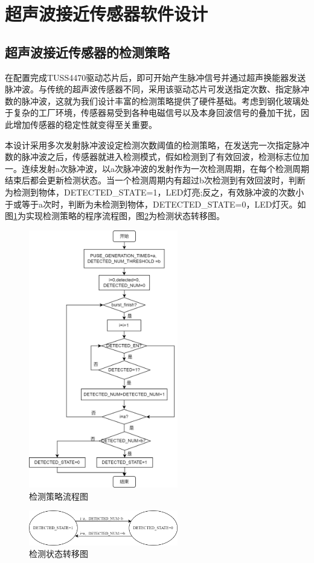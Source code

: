 \newpage
\section{超声波接近传感器软件设计}
\subsection{超声波接近传感器的检测策略}
在配置完成TUSS4470驱动芯片后，即可开始产生脉冲信号并通过超声换能器发送脉冲波。与传统的超声波传感器不同，采用该驱动芯片可发送指定次数、指定脉冲数的脉冲波，这就为我们设计丰富的检测策略提供了硬件基础。考虑到钢化玻璃处于复杂的工厂环境，传感器易受到各种电磁信号以及本身回波信号的叠加干扰，因此增加传感器的稳定性就变得至关重要。\par

本设计采用多次发射脉冲波设定检测次数阈值的检测策略，在发送完一次指定脉冲数的脉冲波之后，传感器就进入检测模式，假如检测到了有效回波，检测标志位加一。连续发射a次脉冲波，以a次脉冲波的发射作为一次检测周期，在每个检测周期结束后都会更新检测状态。当一个检测周期内有超过b次检测到有效回波时，判断为检测到物体，DETECTED\_STATE=1，LED灯亮;反之，有效脉冲波的次数小于或等于a次时，判断为未检测到物体，DETECTED\_STATE=0，LED灯灭。如图\ref{检测策略流程图}为实现检测策略的程序流程图，图\ref{检测状态转移图}为检测状态转移图。
\begin{figure}[!h]
	\centering
	\includegraphics[width=6.5cm]{figure/detection logic.png}
	\caption{检测策略流程图}
	\label{检测策略流程图}%
\end{figure}
\begin{figure}[!h]
	\centering
	\includegraphics[width=6.5cm]{figure/LED state transition diagram.png}
	\caption{检测状态转移图}
	\label{检测状态转移图}%
\end{figure}\par


